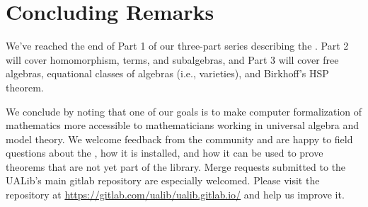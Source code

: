 \documentclass[a4paper,UKenglish,cleveref,autoref,thm-restate,12pt]{../lipics-v2021-wjd}
\begin{document}
\section{Concluding Remarks}\label{sec:concluding-remarks}
We've reached the end of Part 1 of our three-part series describing the \agdaualib.  Part 2 will cover homomorphism, terms, and subalgebras, and Part 3 will cover free algebras, equational classes of algebras (i.e., varieties), and Birkhoff's HSP theorem.



We conclude by noting that one of our goals is to make computer formalization of mathematics more accessible to mathematicians working in universal algebra and model theory. We welcome feedback from the community and are happy to field questions about the \ualib, how it is installed, and how it can be used to prove theorems that are not yet part of the library.  Merge requests submitted to the UALib's main gitlab repository are especially welcomed.  Please visit the repository at \url{https://gitlab.com/ualib/ualib.gitlab.io/} and help us improve it.
\end{document}
